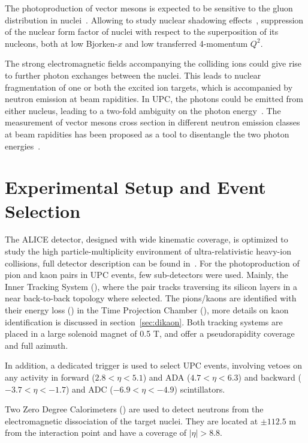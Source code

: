\documentclass[12pt]{article}
\begin{document}
The photoproduction of vector mesons is expected to be sensitive to the gluon distribution in nuclei~\cite{Ryskin,Eskola}. Allowing to study nuclear shadowing effects~\cite{Armesto}, suppression of the nuclear form factor of nuclei with respect to the superposition of its nucleons, both at low Bjorken-$x$ and low transferred 4-momentum $Q^2$.

The strong electromagnetic fields accompanying the colliding ions could give rise to further photon exchanges between the nuclei. This leads to nuclear fragmentation of one or both the excited ion targets, which is accompanied by neutron emission at beam rapidities. In UPC, the photons could be emitted from either nucleus, leading to a two-fold ambiguity on the photon energy~\cite{Klein2}. The measurement of vector mesons cross section in different neutron emission classes at beam rapidities has been proposed as a tool to disentangle the two photon energies~\cite{Baltz,Guzey}.

\section{Experimental Setup and Event Selection}

The ALICE detector, designed with wide kinematic coverage, is optimized to study the high
particle-multiplicity environment of ultra-relativistic heavy-ion collisions, full detector description can be found in~\cite{Abelev,Aamodt}. For the photoproduction of pion and kaon pairs in UPC events, few sub-detectors were used. Mainly, the Inner Tracking System (\ITS), where the pair tracks traversing its silicon layers in a near back-to-back topology where selected. The pions/kaons are identified with their energy loss (\dEdx) in the Time Projection Chamber (\TPC), more details on kaon identification is discussed in section~\ref{sec:dikaon}. Both tracking systems are placed in a large solenoid magnet of 0.5 T, and offer a pseudorapidity coverage  and full azimuth.

In addition, a dedicated trigger is used to select UPC events, involving vetoes on any activity in forward \VZEROA ($2.8<\eta<5.1$) and ADA ($4.7<\eta<6.3$) and backward \VZEROC ($-3.7<\eta<-1.7$) and ADC ($-6.9<\eta<-4.9$) scintillators.

Two Zero Degree Calorimeters (\ZDC) are used to detect neutrons from the electromagnetic dissociation of the target nuclei. They are located at $\pm 112.5$ m from the interaction point and have a coverage of $|\eta|>8.8$.
\end{document}
